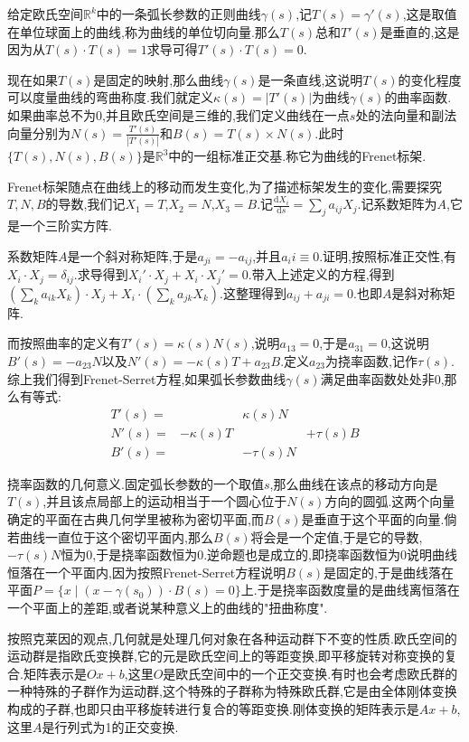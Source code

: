 给定欧氏空间$\mathbb{R}^k$中的一条弧长参数的正则曲线$\gamma(s)$,记$T(s)=\gamma'(s)$,这是取值在单位球面上的曲线,称为曲线的单位切向量.那么$T(s)$总和$T'(s)$是垂直的,这是因为从$T(s)\cdot T(s)=1$求导可得$T'(s)\cdot T(s)=0$.

现在如果$T(s)$是固定的映射,那么曲线$\gamma(s)$是一条直线,这说明$T(s)$的变化程度可以度量曲线的弯曲称度.我们就定义$\kappa(s)=|T'(s)|$为曲线$\gamma(s)$的曲率函数.如果曲率总不为0,并且欧氏空间是三维的,我们定义曲线在一点$s$处的法向量和副法向量分别为$N(s)=\frac{T'(s)}{|T'(s)|}$和$B(s)=T(s)\times N(s)$.此时$\{T(s),N(s),B(s)\}$是$\mathbb{R}^3$中的一组标准正交基.称它为曲线的Frenet标架.

Frenet标架随点在曲线上的移动而发生变化,为了描述标架发生的变化,需要探究$T,N,B$的导数,我们记$X_1=T$,$X_2=N$,$X_3=B$.记$\frac{\mathrm{d}X_i}{\mathrm{d}s}=\sum_ja_{ij}X_j$.记系数矩阵为$A$,它是一个三阶实方阵.

系数矩阵$A$是一个斜对称矩阵,于是$a_{ji}=-a_{ij}$,并且$a_ii\equiv0$.证明,按照标准正交性,有$X_i\cdot X_j=\delta_{ij}$.求导得到$X_i'\cdot X_j+X_i\cdot X_j'=0$.带入上述定义的方程,得到$\left(\sum_ka_{ik}X_k\right)\cdot X_j+X_i\cdot\left(\sum_ka_{jk}X_k\right)$.这整理得到$a_{ij}+a_{ji}=0$.也即$A$是斜对称矩阵.

而按照曲率的定义有$T'(s)=\kappa(s)N(s)$,说明$a_{13}=0$,于是$a_{31}=0$,这说明$B'(s)=-a_{23}N$以及$N'(s)=-\kappa(s)T+a_{23}B$.定义$a_{23}$为挠率函数,记作$\tau(s)$.综上我们得到Frenet-Serret方程,如果弧长参数曲线$\gamma(s)$满足曲率函数处处非0,那么有等式:
$$\begin{array}{cccc}
T'(s)=&&\kappa(s)N&\\
N'(s)=&-\kappa(s)T&&+\tau(s)B\\
B'(s)=&&-\tau(s)N&\end{array}$$

挠率函数的几何意义.固定弧长参数的一个取值$s$,那么曲线在该点的移动方向是$T(s)$,并且该点局部上的运动相当于一个圆心位于$N(s)$方向的圆弧.这两个向量确定的平面在古典几何学里被称为密切平面,而$B(s)$是垂直于这个平面的向量.倘若曲线一直位于这个密切平面内,那么$B(s)$将会是一个定值,于是它的导数,$-\tau(s)N$恒为0,于是挠率函数恒为0.逆命题也是成立的,即挠率函数恒为0说明曲线恒落在一个平面内,因为按照Frenet-Serret方程说明$B(s)$是固定的,于是曲线落在平面$P=\{x\mid(x-\gamma(s_0))\cdot B(s)=0\}$上.于是挠率函数度量的是曲线离恒落在一个平面上的差距,或者说某种意义上的曲线的"扭曲称度".

按照克莱因的观点,几何就是处理几何对象在各种运动群下不变的性质.欧氏空间的运动群是指欧氏变换群,它的元是欧氏空间上的等距变换,即平移旋转对称变换的复合.矩阵表示是$Ox+b$,这里$O$是欧氏空间中的一个正交变换.有时也会考虑欧氏群的一种特殊的子群作为运动群,这个特殊的子群称为特殊欧氏群,它是由全体刚体变换构成的子群,也即只由平移旋转进行复合的等距变换.刚体变换的矩阵表示是$Ax+b$,这里$A$是行列式为1的正交变换.

